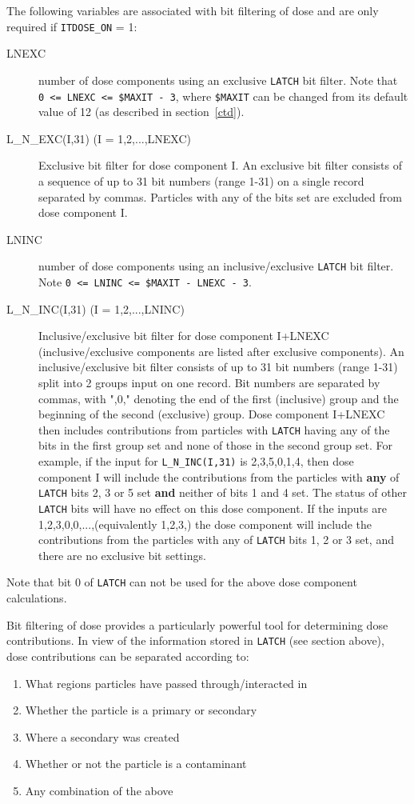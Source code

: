 \documentclass[12pt,twoside]{article}
\begin{document}
The following variables are associated with bit filtering of dose and
are only required if \verb+ITDOSE_ON+ = 1:
\begin{description}
\item [LNEXC] number of dose components using an exclusive {\tt LATCH} bit
filter. Note that\\
\verb+0 <= LNEXC <= $MAXIT - 3+,
where \verb+$MAXIT+ can be changed from its default value of 12
(as described in section~\ref{ctd}).
\item [L\_N\_EXC(I,31) (I = 1,2,...,LNEXC)] Exclusive bit filter for dose
component I. An exclusive bit filter consists of a sequence of up to 31 bit
numbers (range 1-31) on a single record separated by commas. Particles with any
of the bits set are excluded from dose component I.
\item [LNINC] number of dose components using an inclusive/exclusive {\tt LATCH}
bit filter. Note \verb+0 <= LNINC <= $MAXIT - LNEXC - 3+. \item [L\_N\_INC(I,31)
(I = 1,2,...,LNINC)] Inclusive/exclusive bit filter for dose component I+LNEXC
(inclusive/exclusive components are listed after exclusive components).  An
inclusive/exclusive bit filter consists of up to 31 bit numbers (range 1-31)
split into 2 groups input on one record. Bit numbers are separated by commas,
with ",0," denoting the end of the first (inclusive) group and the beginning of
the second (exclusive) group. Dose component I+LNEXC then includes contributions
from particles with \verb+LATCH+ having any of the bits in the first group set
and none of those in the second group set. For example, if the input for
\verb+L_N_INC(I,31)+ is 2,3,5,0,1,4, then dose component I will include the
contributions from the particles with {\bf any} of \verb+LATCH+ bits 2, 3 or 5
set {\bf and} neither of bits 1 and 4 set. The status of other \verb+LATCH+ bits
will have no effect on this dose component.
If the inputs are 1,2,3,0,0,...,(equivalently 1,2,3,)
the dose component  will include
the contributions from the particles with any of \verb+LATCH+
bits 1, 2 or 3
set, and there are no exclusive bit settings.

\end{description}

Note that bit 0 of \verb+LATCH+ can not be  used for the above dose
component calculations.


Bit filtering of dose provides a particularly powerful tool for
determining dose contributions.  In view of the information stored in
\verb+LATCH+ (see section above), dose contributions can be separated
according to:
\begin{enumerate}
\item What regions particles have passed through/interacted in
\item Whether the particle is a primary or secondary
\item Where a secondary was created
\item Whether or not the particle is a
contaminant
\item Any combination of the above
\end{enumerate}
\end{document}
